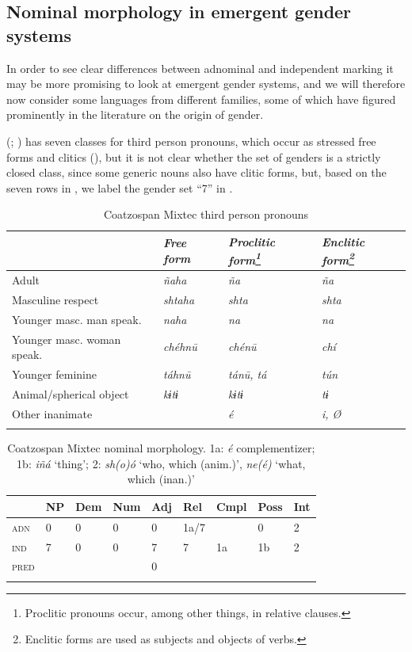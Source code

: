 \documentclass[output=collectionpaper]{langsci/langscibook}
\begin{document}
  \subsection{Nominal morphology in emergent gender systems}
  \label{sec:WDG:4.3}

In order to see clear differences between adnominal and independent marking it may be more promising to look at emergent gender systems, and we will therefore now consider some languages from different families, some of which have figured prominently in the literature on the origin of gender.

 (; \citealt[415]{Small1990}) has seven classes for third person pronouns, which occur as stressed free forms and clitics (), but it is not clear whether the set of genders is a strictly closed class, since some generic nouns also have clitic forms, but, based on the seven rows in , we label the gender set ``7'' in .

\begin{table}
\begin{tabular}{l*{3}{>{\itshape}l}}
\lsptoprule
&	\normalfont Free form	&	\normalfont Proclitic form\footnote{Proclitic pronouns occur, among other things, in relative clauses.}	&	\normalfont Enclitic form\footnote{Enclitic forms are used as subjects and objects of verbs.}\\
\midrule
Adult	&	ñaha	&	ña	&	ña	\\
Masculine respect	&	shtaha	&	shta	&	shta	\\
Younger masc. man speak.	&	naha	&	na	&	na	\\
Younger masc. woman speak.	&	chéhnū	&	chénū	&	chí	\\
Younger feminine	&	táhnū	&	tánū, tá	&	tún	\\
Animal/spherical object	&	kɨtɨ	&	kɨtɨ	&	tɨ	\\
Other inanimate	&		&	é	&	i, Ø	\\
\lspbottomrule
\end{tabular}
\caption{Coatzospan Mixtec third person pronouns\label{tab:WDG:3}}
\end{table}


\begin{table}
\begin{tabular}{*{9}{l}}
\lsptoprule
&	NP	&	Dem	&	Num	&	Adj	&	Rel	&	Cmpl	&	Poss	&	Int	\\
\midrule
\textsc{adn}	&	0	&	0	&	0	&	0	&	1a/7	&		&	0	&	2	\\
\textsc{ind}	&	7	&	0	&	0	&	7	&	7	&	1a	&	1b	&	2	\\
\textsc{pred}	&		&		&		&	0	&		&		&		&		\\
\lspbottomrule
\end{tabular}
\caption{Coatzospan Mixtec nominal morphology. 1a: \textit{é} complementizer; 1b: \textit{iñá} `thing'; 2: \textit{sh(o)ó} `who, which (anim.)', \textit{ne(é)} `what, which (inan.)'\label{tab:WDG:4}}
\end{table}
\end{document}
